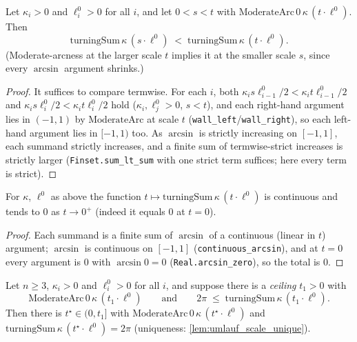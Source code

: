\begin{lemma}
  \label{lem:turning_scale_mono}
  \leanok
  Let $\kappa_i > 0$ and $\ell^0_i > 0$ for all $i$, and let $0 < s < t$ with
  $\mathrm{ModerateArc}\,0\,\kappa\,(t\cdot\ell^0)$. Then
  \[
    \mathrm{turningSum}\,\kappa\,(s\cdot\ell^0)
      \;<\; \mathrm{turningSum}\,\kappa\,(t\cdot\ell^0).
  \]
  (Moderate-arcness at the larger scale $t$ implies it at the smaller scale $s$,
  since every $\arcsin$ argument shrinks.)
\end{lemma}

\begin{proof}
  \leanok
  It suffices to compare termwise. For each $i$, both
  $\kappa_i s \ell^0_{i-1}/2 < \kappa_i t \ell^0_{i-1}/2$ and
  $\kappa_i s \ell^0_i/2 < \kappa_i t \ell^0_i/2$ hold ($\kappa_i,\ell^0_j>0$,
  $s<t$), and each right-hand argument lies in $(-1,1)$ by
  $\mathrm{ModerateArc}$ at scale $t$ (\texttt{wall\_left}/\texttt{wall\_right}),
  so each left-hand argument lies in $[-1,1)$ too. As $\arcsin$ is strictly
  increasing on $[-1,1]$, each summand strictly increases, and a finite sum of
  termwise-strict increases is strictly larger (\texttt{Finset.sum\_lt\_sum} with
  one strict term suffices; here every term is strict).
\end{proof}

\begin{lemma}
  \label{lem:turning_scale_zero}
  \leanok
  For $\kappa$, $\ell^0$ as above the function
  $t \mapsto \mathrm{turningSum}\,\kappa\,(t\cdot\ell^0)$ is continuous and tends
  to $0$ as $t \to 0^+$ (indeed it equals $0$ at $t = 0$).
\end{lemma}

\begin{proof}
  \leanok
  Each summand is a finite sum of $\arcsin$ of a continuous (linear in $t$)
  argument; $\arcsin$ is continuous on $[-1,1]$ (\texttt{continuous\_arcsin}),
  and at $t = 0$ every argument is $0$ with $\arcsin 0 = 0$
  (\texttt{Real.arcsin\_zero}), so the total is $0$.
\end{proof}

\begin{lemma}
  \label{lem:exists_umlauf_scale}
  \leanok
  Let $n \ge 3$, $\kappa_i > 0$ and $\ell^0_i > 0$ for all $i$, and suppose there
  is a \emph{ceiling} $t_1 > 0$ with
  \[
    \mathrm{ModerateArc}\,0\,\kappa\,(t_1\cdot\ell^0)
    \qquad\text{and}\qquad
    2\pi \;\le\; \mathrm{turningSum}\,\kappa\,(t_1\cdot\ell^0).
  \]
  Then there is $t^\star \in (0, t_1]$ with
  $\mathrm{ModerateArc}\,0\,\kappa\,(t^\star\cdot\ell^0)$ and
  $\mathrm{turningSum}\,\kappa\,(t^\star\cdot\ell^0) = 2\pi$
  (uniqueness: \cref{lem:umlauf_scale_unique}).
\end{lemma}

